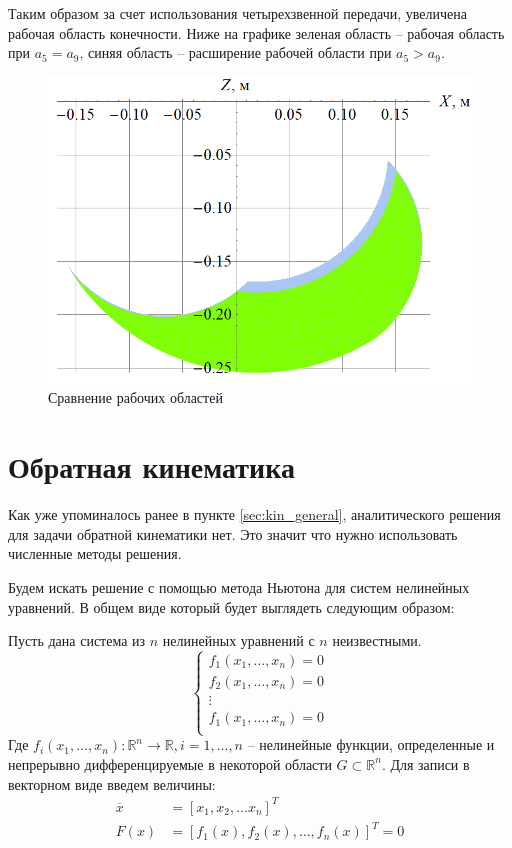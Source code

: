 Таким образом за счет использования четырехзвенной передачи, увеличена рабочая область конечности. Ниже на графике зеленая область -- рабочая область при $ a_5 = a_9 $, синяя область -- расширение рабочей области при $ a_5 > a_9 $.
\begin{figure}[h]
    \centering
    \includegraphics[scale=0.8]{chapter_kinematics/figure7.png}
    \caption{Сравнение рабочих областей}
    \label{}
\end{figure}

\section{Обратная кинематика}
Как уже упоминалось ранее в пункте \ref{sec:kin_general}, аналитического решения для задачи обратной кинематики нет. Это значит что нужно использовать численные методы решения.

Будем искать решение с помощью метода Ньютона для систем нелинейных уравнений. В общем виде который будет выглядеть следующим образом:

Пусть дана система из $ n $ нелинейных уравнений с $ n $ неизвестными.
\[
\left\{ 
\begin{array}{c}
    f_1(x_1, \dots, x_n) = 0 \\
    f_2(x_1, \dots, x_n) = 0 \\
    \vdots \\
    f_1(x_1, \dots, x_n) = 0 \\
\end{array} 
\right.
\]
\noindent Где $ f_i(x_1,\dots,x_n): \mathbb{R}^n \rightarrow \mathbb{R}, i=1,\dots, n $ -- нелинейные функции, определенные и непрерывно дифференцируемые в некоторой области $ G \subset \mathbb{R}^n $. Для записи в векторном виде введем величины:
\begin{align*}
    \overline{x} &= [x_1, x_2, \dots x_n]^T \\
    F(x) &= [f_1(x), f_2(x),\dots,f_n(x)]^T = 0
\end{align*}

